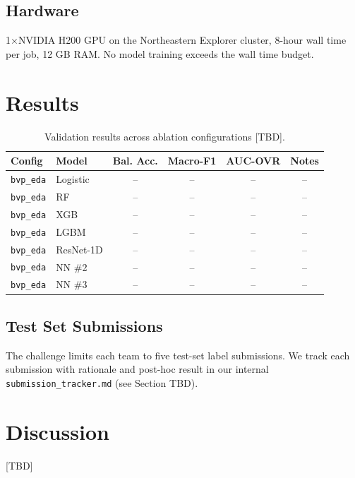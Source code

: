 \documentclass[conference]{IEEEtran}
\begin{document}
\subsection{Hardware}
1$\times$NVIDIA H200 GPU on the Northeastern Explorer cluster, 8-hour wall
time per job, 12 GB RAM. No model training exceeds the wall time budget.

\section{Results}

\begin{table}[h]
\centering
\caption{Validation results across ablation configurations [TBD].}
\begin{tabular}{llcccc}
\toprule
Config & Model & Bal. Acc. & Macro-F1 & AUC-OVR & Notes \\
\midrule
\texttt{bvp\_eda} & Logistic & -- & -- & -- & -- \\
\texttt{bvp\_eda} & RF & -- & -- & -- & -- \\
\texttt{bvp\_eda} & XGB & -- & -- & -- & -- \\
\texttt{bvp\_eda} & LGBM & -- & -- & -- & -- \\
\texttt{bvp\_eda} & ResNet-1D & -- & -- & -- & -- \\
\texttt{bvp\_eda} & NN \#2 & -- & -- & -- & -- \\
\texttt{bvp\_eda} & NN \#3 & -- & -- & -- & -- \\
\bottomrule
\end{tabular}
\end{table}

\subsection{Test Set Submissions}
The challenge limits each team to five test-set label submissions. We track
each submission with rationale and post-hoc result in our internal
\texttt{submission\_tracker.md} (see Section TBD).

\section{Discussion}
[TBD]
\end{document}
